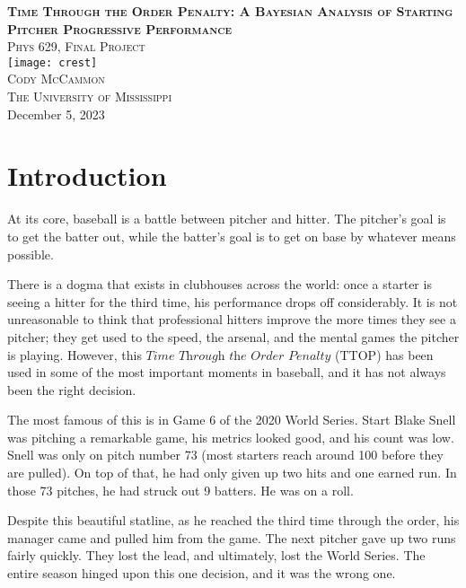 \documentclass[a4paper,12pt]{article}
\begin{document}
\begin{center}
\textsc{\Huge \textbf{Time Through the Order Penalty: A Bayesian Analysis of Starting Pitcher Progressive Performance}}
\\ [.25in]
\textsc{\large Phys 629, Final Project}
\\[2.5in]
\texttt{[image: crest]}
\\[2.85in]
\textsc{\Large Cody McCammon}\\
\textsc{\large The University of Mississippi}\\
December 5, 2023
\end{center}

\clearpage
\tableofcontents
{}

\clearpage

\section{Introduction}
At its core, baseball is a battle between pitcher and hitter. The pitcher's goal is to get the batter out, while the batter's goal is to get on base by whatever means possible. 

There is a dogma that exists in clubhouses across the world: once a starter is seeing a hitter for the third time, his performance drops off considerably. It is not unreasonable to think that professional hitters improve the more times they see a pitcher; they get used to the speed, the arsenal, and the mental games the pitcher is playing. However, this $\textit{Time Through the Order Penalty}$ (TTOP) has been used in some of the most important moments in baseball, and it has not always been the right decision.

The most famous of this is in Game 6 of the 2020 World Series. Start Blake Snell was pitching a remarkable game, his metrics looked good, and his count was low. Snell was only on pitch number 73 (most starters reach around 100 before they are pulled). On top of that, he had only given up two hits and one earned run. In those 73 pitches, he had struck out 9 batters. He was on a roll.

Despite this beautiful statline, as he reached the third time through the order, his manager came and pulled him from the game. The next pitcher gave up two runs fairly quickly. They lost the lead, and ultimately, lost the World Series. The entire season hinged upon this one decision, and it was the wrong one.
\end{document}
